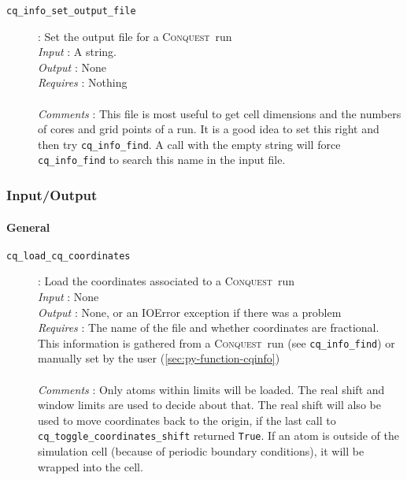 \documentclass[a4paper,notitlepage,11pt]{article}
\def\CQ{\textsc{Conquest}}
\begin{document}
\begin{description}
\item[\texttt{cq\_info\_set\_output\_file}]: Set the output file for a \CQ\ run\\
  \emph{Input} : A string.\\
  \emph{Output} : None\\
  \emph{Requires} : Nothing\\
  \\
  \emph{Comments} : This file is most useful to get cell dimensions and the numbers of cores and grid points of a run.
  It is a good idea to set this right and then try \texttt{cq\_info\_find}.
  A call with the empty string will force \texttt{cq\_info\_find} to search this name in the input file.
\end{description}


\subsubsection{Input/Output}
\label{sec:py-functions-io}

\paragraph{General}
\label{sec:py-function-io-general}

\begin{description}
\item[\texttt{cq\_load\_cq\_coordinates}]: Load the coordinates associated to a \CQ\ run \\ 
\emph{Input} : None\\ 
\emph{Output} : None, or an IOError exception if there was a problem\\
  \emph{Requires} : The name of the file and whether coordinates are
  fractional. This information is gathered from a \CQ\ run (see
  \texttt{cq\_info\_find}) or manually set by the user (\ref{sec:py-function-cqinfo})\\
  \\
  \emph{Comments} : Only atoms within limits will be loaded. The real shift
  and window limits are used to decide about that. The real shift will also be
  used to move coordinates back to the origin, if the last call to
  \texttt{cq\_toggle\_coordinates\_shift} returned \texttt{True}. If an atom is
  outside of the simulation cell (because of periodic boundary conditions), it will be wrapped into the cell. \\
\end{description}
\end{document}
